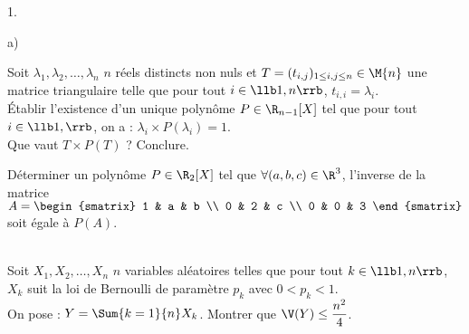 \documentclass[11pt]{article}%
\begin{document}
\begin{exerciceAP}
\begin{noliste}{1.}
\begin{noliste}{a)}
    \item Soit $\lambda_1,\lambda_2,\hdots,\lambda_n$ $n$ réels
      distincts non nuls et $T=(t_{i,j})_{1\leq i,j\leq n}\in\M{n}$
      une matrice triangulaire telle que pour tout $i\in\llb 1,n\rrb$,
      $t_{i,i}=\lambda_i$.\\
      Établir l'existence d'un unique polynôme $P\in\R_{n-1}[X]$ tel
      que pour tout $i\in\llb 1,\rrb$, on a : $\lambda_i \times
      P(\lambda_i) = 1$.\\
      Que vaut $T \times P(T)$ ? Conclure.
    \end{noliste}
  \item Déterminer un polynôme $P\in\R_2[X]$ tel que $\forall
    (a,b,c)\in\R^3$, l'inverse de la matrice $A =
    \begin{smatrix}
      1 & a & b \\ 
      0 & 2 & c \\ 
      0 & 0 & 3
    \end{smatrix}$ soit égale à $P(A)$.
  \end{noliste}
\end{exerciceAP}


\begin{exerciceSP}~\\
  Soit $X_1,X_2,\hdots,X_n$ $n$ variables aléatoires telles que pour
  tout $k\in\llb 1,n\rrb$, $X_k$ suit la loi de Bernoulli de paramètre
  $p_k$ avec $0<p_k<1$.\\
  On pose : $Y=\Sum{k=1}{n} X_k$. Montrer que $\V(Y)\leq
  \dfrac{n^2}{4}$.
\end{exerciceSP}


\newpage
\end{document}
